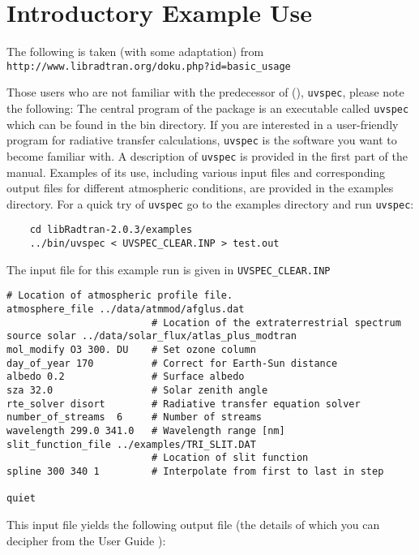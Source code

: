 \section{Introductory Example Use}

The following is taken (with some adaptation) from \\
\lstinline{http://www.libradtran.org/doku.php?id=basic_usage}

Those users who are not familiar with the predecessor of \libradtran(), \lstinline{uvspec}, please note the following: The central program of the package is an executable called \lstinline{uvspec} which can be found in the bin directory. If you are interested in a user-friendly program for radiative transfer calculations, \lstinline{uvspec} is the software you want to become familiar with. A description of \lstinline{uvspec} is provided in the first part of the manual. Examples of its use, including various input files and corresponding output files for different atmospheric conditions, are provided in the examples directory. For a quick try of \lstinline{uvspec} go to the examples directory and run \lstinline{uvspec}:

\begin{lstlisting}
    cd libRadtran-2.0.3/examples
    ../bin/uvspec < UVSPEC_CLEAR.INP > test.out
\end{lstlisting}



The input file for this example run is given in \lstinline{UVSPEC_CLEAR.INP}

\begin{lstlisting}[style=tinysize]
                         # Location of atmospheric profile file. 
atmosphere_file ../data/atmmod/afglus.dat
                         # Location of the extraterrestrial spectrum
source solar ../data/solar_flux/atlas_plus_modtran
mol_modify O3 300. DU    # Set ozone column
day_of_year 170          # Correct for Earth-Sun distance
albedo 0.2               # Surface albedo
sza 32.0                 # Solar zenith angle
rte_solver disort        # Radiative transfer equation solver
number_of_streams  6     # Number of streams
wavelength 299.0 341.0   # Wavelength range [nm]
slit_function_file ../examples/TRI_SLIT.DAT
                         # Location of slit function
spline 300 340 1         # Interpolate from first to last in step

quiet
\end{lstlisting}

This input file yields the following output file (the details of which you can decipher from the \libradtran{} User Guide \cite{libRadTranUserGuide2019}):


